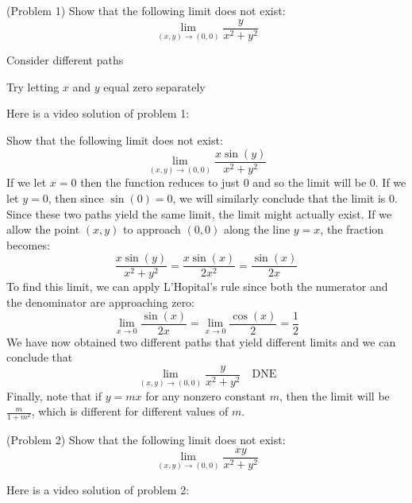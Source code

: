 \documentclass[handout]{ximera}
\begin{document}
\begin{problem}(Problem 1)
Show that the following limit does not exist:
\[
\lim_{(x,y) \to (0,0)} \frac{y}{x^2 + y^2}
\]
\begin{hint}
Consider different paths
\end{hint}
\begin{hint}
Try letting $x$ and $y$ equal zero separately
\end{hint}
\end{problem}

Here is a video solution of problem 1:\\

\begin{foldable}
\end{foldable}



\begin{example}[Example 2]
Show that the following limit does not exist:
\[
\lim_{(x,y) \to (0,0)} \frac{x\sin(y)}{x^2 + y^2}
\]
If we let $x = 0$ then the function reduces to just $0$ and so the 
limit will be $0$. 
If we let $y = 0$, then since $\sin (0) = 0$, we will similarly conclude 
that the limit is $0$.
Since these two paths yield the same limit, the limit might actually exist. 
If we allow the point $(x,y)$ to approach $(0,0)$ along the line $y = x$, the fraction becomes:
\[
\frac{x\sin(y)}{x^2 + y^2} = \frac{x\sin(x)}{2x^2} = \frac{\sin(x)}{2x}
\]
To find this limit, we can apply L'Hopital's rule since both the numerator and the denominator are approaching zero:
\[
\lim_{x \to 0} \frac{\sin(x)}{2x} = \lim_{x \to 0} \frac{\cos(x)}{2} = \frac12
\]
We have now obtained two different paths that yield different limits and we can conclude that
\[
\lim_{(x,y) \to (0,0)} \frac{y}{x^2 + y^2} \quad \text{DNE}
\]
Finally, note that if $y=mx$ for any nonzero constant $m$, 
then the limit will be $\frac{m}{1+m^2}$, 
which is different for different values of $m$.
\end{example}

\begin{problem}(Problem 2)
Show that the following limit does not exist:
\[
\lim_{(x,y) \to (0,0)} \frac{xy}{x^2 + y^2}
\]
\end{problem}

Here is a video solution of problem 2:\\

\begin{foldable}
\end{foldable}
\end{document}
